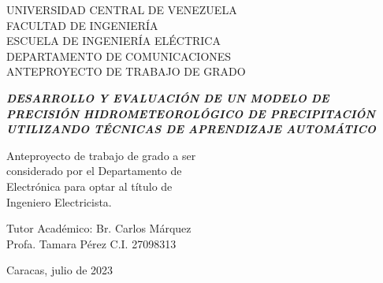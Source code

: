 \begin{titlepage}
  \centering
  { UNIVERSIDAD CENTRAL DE VENEZUELA \\
  FACULTAD DE INGENIERÍA\\
ESCUELA DE INGENIERÍA ELÉCTRICA\\
DEPARTAMENTO DE COMUNICACIONES\\
ANTEPROYECTO DE TRABAJO DE GRADO \\}
  
  \null\vfill
    \centering
    {\large
    \textbf{\textit{DESARROLLO Y EVALUACIÓN DE UN MODELO DE PRECISIÓN HIDROMETEOROLÓGICO DE PRECIPITACIÓN UTILIZANDO TÉCNICAS DE APRENDIZAJE AUTOMÁTICO\\}}}
    \null
    \vfill
    {
      \begin{flushright}
      \small Anteproyecto de trabajo de grado a ser \\
      considerado por el Departamento de \\
      Electrónica para optar al título de \\
      Ingeniero Electricista.\\
    \end{flushright}
    }
    \vfill
    {
      Tutor Académico: \hfill Br. Carlos Márquez \\
      Profa. Tamara Pérez \hfill C.I. 27098313
    }

    \null
    {Caracas, julio de 2023}
    \null\vfill
  \end{titlepage}